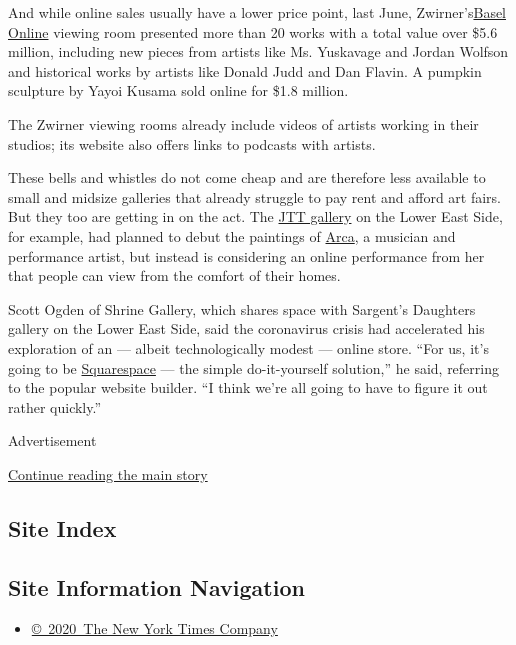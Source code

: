 And while online sales usually have a lower price point, last June,
Zwirner's\href{https://www.davidzwirner.com/viewing-room/basel-online}{Basel
Online} viewing room presented more than 20 works with a total value
over \$5.6 million, including new pieces from artists like Ms. Yuskavage
and Jordan Wolfson and historical works by artists like Donald Judd and
Dan Flavin. A pumpkin sculpture by Yayoi Kusama sold online for \$1.8
million.

The Zwirner viewing rooms already include videos of artists working in
their studios; its website also offers links to podcasts with artists.

These bells and whistles do not come cheap and are therefore less
available to small and midsize galleries that already struggle to pay
rent and afford art fairs. But they too are getting in on the act. The
\href{http://www.jttnyc.com/6953}{JTT gallery} on the Lower East Side,
for example, had planned to debut the paintings of
\href{https://en.wikipedia.org/wiki/Arca_(musician)}{Arca}, a musician
and performance artist, but instead is considering an online performance
from her that people can view from the comfort of their homes.

Scott Ogden of Shrine Gallery, which shares space with Sargent's
Daughters gallery on the Lower East Side, said the coronavirus crisis
had accelerated his exploration of an --- albeit technologically modest
--- online store. ``For us, it's going to be
\href{https://www.squarespace.com/}{Squarespace} --- the simple
do-it-yourself solution,'' he said, referring to the popular website
builder. ``I think we're all going to have to figure it out rather
quickly.''

Advertisement

\protect\hyperlink{after-bottom}{Continue reading the main story}

\hypertarget{site-index}{%
\subsection{Site Index}\label{site-index}}

\hypertarget{site-information-navigation}{%
\subsection{Site Information
Navigation}\label{site-information-navigation}}

\begin{itemize}
\tightlist
\item
  \href{https://help.nytimes3xbfgragh.onion/hc/en-us/articles/115014792127-Copyright-notice}{©~2020~The
  New York Times Company}
\end{itemize}

